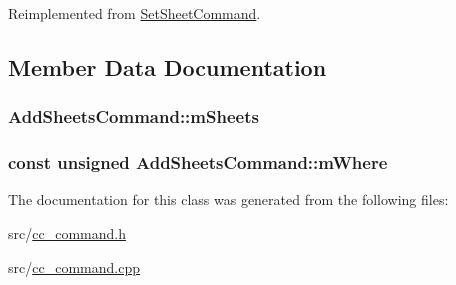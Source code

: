 Reimplemented from \hyperlink{a00134_a027700275d409b94185dfb3aa2d792bb}{Set\-Sheet\-Command}.



\subsection{Member Data Documentation}
\hypertarget{a00001_a1e2bbc755b75b02774e83b5e8c1c27f0}{
\subsubsection[{m\-Sheets}]{ Add\-Sheets\-Command\-::m\-Sheets\hspace{0.3cm}{\ttfamily [protected]}}}\label{a00001_a1e2bbc755b75b02774e83b5e8c1c27f0}
\hypertarget{a00001_a5456fb7e9af34bf953e0e74628d4165d}{
\subsubsection[{m\-Where}]{\setlength{\rightskip}{0pt plus 5cm}const unsigned Add\-Sheets\-Command\-::m\-Where\hspace{0.3cm}{\ttfamily [protected]}}}\label{a00001_a5456fb7e9af34bf953e0e74628d4165d}


The documentation for this class was generated from the following files\-:\begin{DoxyCompactItemize}
\item 
src/\hyperlink{a00183}{cc\-\_\-command.\-h}\item 
src/\hyperlink{a00182}{cc\-\_\-command.\-cpp}\end{DoxyCompactItemize}
